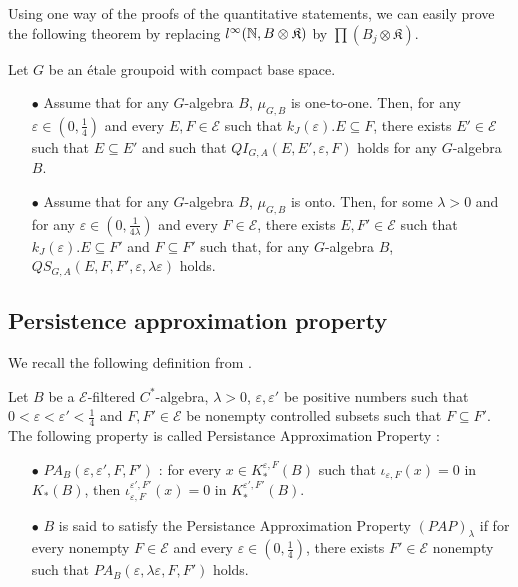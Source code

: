 Using one way of the proofs of the quantitative statements, we can easily prove the following theorem by replacing $l^\infty(\mathbb N,B\otimes \mathfrak K)$ by $\prod (B_j \otimes \mathfrak K)$.

\begin{thm} Let $G$ be an étale groupoid with compact base space. 
\begin{itemize}
\item[$\bullet$] Assume that for any $G$-algebra $B$, $\mu_{G,B}$ is one-to-one. Then, for any $\varepsilon\in (0,\frac{1}{4})$ and every $E,F\in\mathcal E$ such that $k_J(\varepsilon). E\subseteq F$, there exists $E'\in\mathcal E$ such that $E\subseteq E'$ and such that $QI_{G,A}(E,E',\varepsilon,F)$ holds for any $G$-algebra $B$.
\item[$\bullet$] Assume that for any $G$-algebra $B$, $\mu_{G,B}$ is onto. Then, for some $\lambda>0$ and for any $\varepsilon\in (0,\frac{1}{4\lambda})$ and every $F\in\mathcal E$, there exists $E,F'\in\mathcal E$ such that $k_J(\varepsilon). E\subseteq F'$ and $F\subseteq F'$ such that, for any $G$-algebra $B$, $QS_{G,A}(E, F,F',\varepsilon,\lambda \varepsilon)$ holds.
\end{itemize}
\end{thm}

\subsection{Persistence approximation property}

We recall the following definition from \cite{OY3}.

\begin{definition}
Let $B$ be a $\mathcal E$-filtered $C^*$-algebra, $\lambda>0$, $\varepsilon,\varepsilon'$ be positive numbers such that $0<\varepsilon <\varepsilon' <\frac{1}{4}$ and $F,F'\in\mathcal E$ be nonempty controlled subsets such that $F\subseteq F'$. The following property is called Persistance Approximation Property :
\begin{itemize}
\item[$\bullet$] $PA_B(\varepsilon,\varepsilon',F,F')$ : for every $x\in K_*^{\varepsilon,F}(B)$ such that $\iota_{\varepsilon,F}(x)=0$ in $K_*(B)$, then $\iota_{\varepsilon,F}^{\varepsilon',F'}(x)=0$ in $K_*^{\varepsilon',F'}(B)$.
\item[$\bullet$] $B$ is said to satisfy the Persistance Approximation Property $(PAP)_\lambda$ if for every nonempty $F\in\mathcal E$ and every $\varepsilon\in (0,\frac{1}{4})$, there exists $F'\in\mathcal E$ nonempty such that $PA_B(\varepsilon,\lambda\varepsilon,F,F')$ holds.
\end{itemize}
\end{definition}

